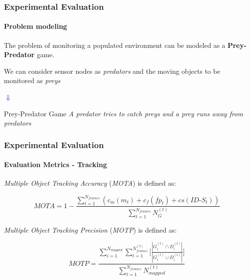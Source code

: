 \begin{frame}
	\frametitle{Experimental Evaluation}
	\framesubtitle{Problem modeling}
	
	\Large
	
	\vspace{0.3cm}
	
	The problem of monitoring a populated environment can be modeled as a \textbf{Prey-Predator}
	game.
	
	\vspace{0.3cm}
	
	We can consider sensor nodes as \emph{predators} and the moving objects to be monitored as
	\emph{preys}
	
	\vspace{-0.5cm}
	
	\begin{center}
		\Huge
		\textcolor{blue}{$ \Downarrow $}
	\end{center}
	
	\vspace{-0.5cm}
	
	\begin{block}{Prey-Predator Game}
		\emph{A predator tries to catch preys and a prey runs away from predators}
	\end{block}
\end{frame}

\begin{frame}
	\frametitle{Experimental Evaluation}
	\framesubtitle{Evaluation Metrics - Tracking}
	
	\Large
	
	\vspace{0.5cm}
	
	\emph{Multiple Object Tracking Accuracy} (\emph{MOTA}) is defined as:
	
	\vspace{-0.5cm}
	
	\begin{equation*}
		MOTA = 1 - \frac{\sum_{t=1}^{N_{frames}} (c_m(m_t) + c_f(fp_t) + cs(ID\mbox{-}S_t))}{\sum_{t=1}^{N_{frames}} N_G^{(t)}}
	\end{equation*}
	
	\vspace{0.4cm}
	
	\emph{Multiple Object Tracking Precision} (\emph{MOTP}) is defined as:
	
	\vspace{-0.1cm}
	
	\begin{equation*}
		MOTP = \frac{\sum_{i=1}^{N_{mapped}} \sum_{t=1}^{N_{frames}^{(t)}} \Big [ \frac{| G_i^{(t)} \cap D_i^{(t)} |}{| G_i^{(t)} \cup D_i^{(t)} |} \Big ] }{\sum_{t=1}^{N_{frames}} N_{mapped}^{(t)}}
	\end{equation*}
\end{frame}

